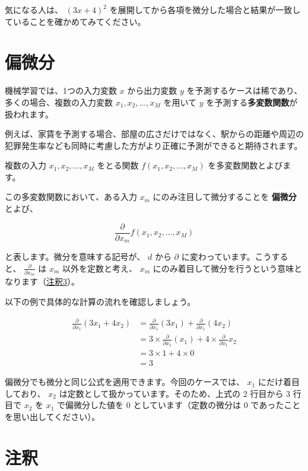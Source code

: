 気になる人は、 $(3x + 4)^2$ を展開してから各項を微分した場合と結果が一致していることを確かめてみてください。


\section{偏微分}


機械学習では、1つの入力変数 $x$ から出力変数 $y$ を予測するケースは稀であり、多くの場合、複数の入力変数 $x_1, x_2, \dots, x_M$ を用いて $y$ を予測する\textbf{多変数関数}が扱われます。

例えば、家賃を予測する場合、部屋の広さだけではなく、駅からの距離や周辺の犯罪発生率なども同時に考慮した方がより正確に予測ができると期待されます。

複数の入力 $x_1, x_2, \dots, x_M$ をとる関数 $f(x_1, x_2, \dots, x_M)$ を多変数関数とよびます。

この多変数関数において、ある入力 $x_m$ にのみ注目して微分することを \textbf{偏微分} とよび、


\[
\frac{\partial}{\partial x_{m}} f(x_1, x_2, \dots, x_M)
\]


と表します。微分を意味する記号が、 $d$ から $\partial$ に変わっています。こうすると、 $\frac{\partial}{\partial x_m}$ は $x_m$ 以外を定数と考え、 $x_m$ にのみ着目して微分を行うという意味となります（\hyperref[04-basics-of-differential-note3]{注釈3}）。


以下の例で具体的な計算の流れを確認しましょう。


\[
\begin{aligned}
\frac{\partial}{\partial x_1}
\left( 3x_1+4x_2 \right)
&= \frac{\partial}{\partial x_1}
\left( 3x_1 \right) + \frac{\partial}{\partial x_1} \left( 4x_2 \right) \\
&= 3 \times \frac{\partial}{\partial x_1} \left( x_1 \right) + 4 \times \frac{\partial}{\partial x_1} x_2 \\
&= 3 \times 1 + 4 \times 0 \\
&= 3
\end{aligned}
\]


偏微分でも微分と同じ公式を適用できます。今回のケースでは、 $x_1$ にだけ着目しており、 $x_2$ は定数として扱かっています。そのため、上式の 2 行目から 3 行目で $x_2$ を $x_1$ で偏微分した値を $0$ としています（定数の微分は $0$ であったことを思い出してください）。


\section{注釈}


